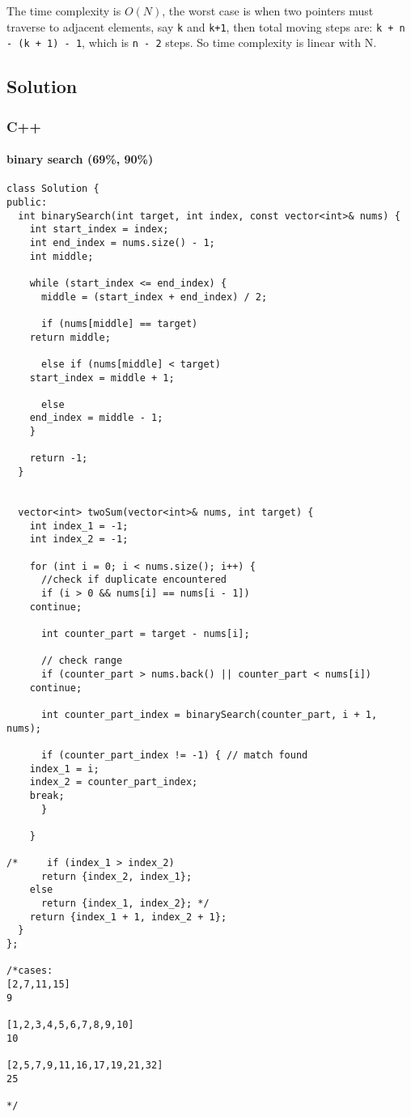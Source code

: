 \documentclass[11pt]{article}
\begin{document}
The time complexity is \(O(N)\), the worst case is when two pointers must traverse to adjacent elements, say \texttt{k} and \texttt{k+1}, then total moving steps are: \texttt{k + n - (k + 1) - 1}, which is \texttt{n - 2} steps. So time complexity is linear with N.

\subsection{Solution}
\label{sec:orga54d578}
\subsubsection{C++}
\label{sec:orged31ba9}
\paragraph{binary search (69\%, 90\%)}
\label{sec:org082b1fc}
\begin{verbatim}
class Solution {
public:
  int binarySearch(int target, int index, const vector<int>& nums) {
    int start_index = index;
    int end_index = nums.size() - 1;
    int middle;

    while (start_index <= end_index) {
      middle = (start_index + end_index) / 2;

      if (nums[middle] == target)
	return middle;

      else if (nums[middle] < target)
	start_index = middle + 1;

      else
	end_index = middle - 1;
    }

    return -1;
  }


  vector<int> twoSum(vector<int>& nums, int target) {    
    int index_1 = -1;
    int index_2 = -1;

    for (int i = 0; i < nums.size(); i++) {
      //check if duplicate encountered
      if (i > 0 && nums[i] == nums[i - 1])
	continue;

      int counter_part = target - nums[i];

      // check range
      if (counter_part > nums.back() || counter_part < nums[i])
	continue;

      int counter_part_index = binarySearch(counter_part, i + 1, nums);

      if (counter_part_index != -1) { // match found
	index_1 = i;
	index_2 = counter_part_index;
	break;
      }     

    }

/*     if (index_1 > index_2)
      return {index_2, index_1};
    else
      return {index_1, index_2}; */
    return {index_1 + 1, index_2 + 1};
  }
};

/*cases: 
[2,7,11,15]
9

[1,2,3,4,5,6,7,8,9,10]
10

[2,5,7,9,11,16,17,19,21,32]
25

*/
\end{verbatim}
\end{document}
